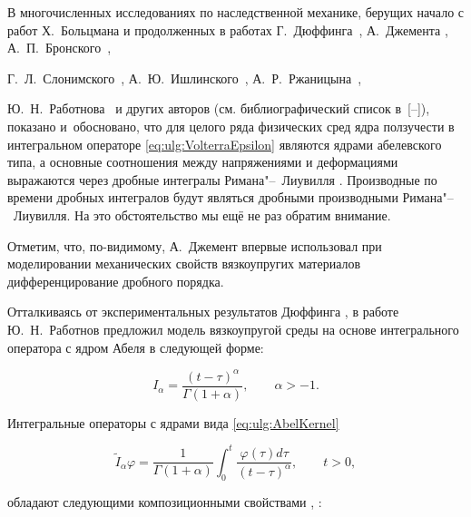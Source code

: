 В многочисленных исследованиях по наследственной механике, берущих начало с работ Х.~Больцмана \cite{ulg:bib:Boltzman} и продолженных в работах Г.~Дюффинга~\cite{ulg:bib:Duffing}, А.~Джемента \cite{ulg:bib:Gemant1936}, А.~П.~Бронского~\cite{ulg:bib:Bronsky}, 

Г.~Л.~Слонимского~\cite{ulg:bib:Slonimsky}, \linebreak А.~Ю.~Ишлинского~\cite{ulg:bib:Ishlinsky1940}, А.~Р.~Ржаницына~\cite{ulg:bib:Rganitsin}, 

Ю.~Н.~Работнова~\cite{ulg:bib:Rabotnov1948} и других авторов (см. библиографический список в~[--]), показано и~обосновано, что для целого ряда физических сред ядра ползучести в интегральном операторе \eqref{eq:ulg:VolterraEpsilon} являются ядрами абелевского типа, а основные соотношения между напряжениями и деформациями выражаются через дробные интегралы Римана"--~Лиувилля \cite{ulg:bib:S-K-M}. Производные по времени дробных интегралов будут являться дробными производными Римана"--~Лиувилля. На это обстоятельство мы ещё не раз обратим внимание. 

Отметим, что, по-видимому, А.~Джемент \cite{ulg:bib:Gemant1938} впервые использовал при моделировании механических свойств вязкоупругих материалов дифференцирование дробного порядка.



Отталкиваясь от экспериментальных результатов Дюффинга \cite{ulg:bib:Duffing}, в работе \cite{ulg:bib:Rabotnov1948} Ю.~Н.~Работнов предложил модель вязкоупругой среды на основе интегрального оператора с ядром Абеля в следующей форме:

\begin{equation}\label{eq:ulg:AbelKernel}

I_{\alpha}=\frac{(t-\tau)^{\alpha}}{\Gamma(1+\alpha)}, \qquad \alpha>-1.

\end{equation}



Интегральные операторы с ядрами вида \eqref{eq:ulg:AbelKernel}

$$

\tilde{I}_{\alpha}\varphi=\frac{1}{\Gamma(1+\alpha)}\int ^{t}_{0}\frac{\varphi(\tau)d\tau}{(t-\tau)^{\alpha}}, \qquad t>0,

$$

обладают следующими композиционными свойствами \cite[с.~28]{ulg:bib:Rabotnov1977}, \cite{ulg:bib:Rabotnov1948}:

$$

